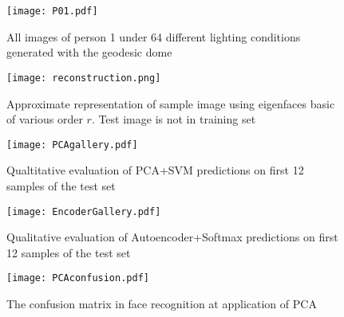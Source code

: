 \begin{figure}[h]
  \centering
  \texttt{[image: P01.pdf]}
  \caption{All images of person 1 under 64 different lighting conditions generated with the geodesic dome}
  \label{P01}
\end{figure}

\begin{figure}[htbp]
  \centering
  \texttt{[image: reconstruction.png]}
  \caption{Approximate representation of sample image using eigenfaces basic of various order $r$. Test image is not in training set}
  \label{appendix:reconstruction}
\end{figure}

\begin{figure}[htbp]
  \centering
  \texttt{[image: PCAgallery.pdf]}
  \caption{Qualtitative evaluation of PCA+SVM predictions on first 12 samples of the test set}
  \label{appendix:PCAgallery}
\end{figure}

\begin{figure}[htbp]
  \centering
  \texttt{[image: EncoderGallery.pdf]}
  \caption{Qualitative evaluation of Autoencoder+Softmax predictions on first 12 samples of the test set}
  \label{appendix:Encodergallery}
\end{figure}

\begin{figure}[p]
  \centering
  \texttt{[image: PCAconfusion.pdf]}
  \caption{The confusion matrix in face recognition at application of PCA}
  \label{appendix:PCAconfusion}
\end{figure}
